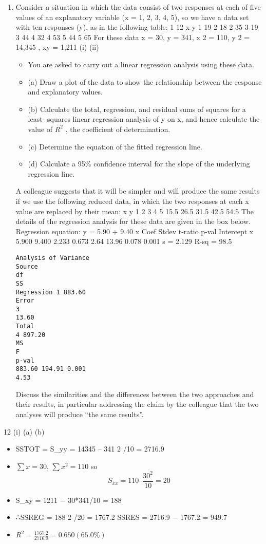 \documentclass[a4paper,12pt]{article}
\begin{document}
\begin{enumerate}

\item Consider a situation in which the data consist of two responses at each of five values of an explanatory variable (x = 1, 2, 3, 4, 5), so we have a data set with ten responses (y), as in the following table:
1
12
x
y
1
19
2
18
2
35
3
19
3
44
4
32
4
53
5
44
5
65
For these data \sum x = 30, \sum y = 341, \sum x 2 = 110, \sum y 2 = 14,345 , \sum xy = 1,211
(i)
(ii)
\begin{itemize}
\item You are asked to carry out a linear regression analysis using these data.
\item (a) Draw a plot of the data to show the relationship between the response and explanatory values.
\item (b) Calculate the total, regression, and residual sums of squares for a least- squares linear regression analysis of y on x, and hence calculate the value of $R^2$ , the coefficient of determination.
\item (c) Determine the equation of the fitted regression line.
\item (d) Calculate a 95\% confidence interval for the slope of the underlying regression line.
\end{itemize}
A colleague suggests that it will be simpler and will produce the same results if we use the following reduced data, in which the two responses at each x
value are replaced by their mean:
x
y
1
2
3
4
5
15.5 26.5 31.5 42.5 54.5
The details of the regression analysis for these data are given in the box below.
Regression equation: y = 5.90 + 9.40 x
Coef Stdev t-ratio p-val
Intercept
x 5.900
9.400 2.233
0.673 2.64
13.96 0.078
0.001
s = 2.129 R-sq = 98.5%
\begin{verbatim}
Analysis of Variance
Source
df
SS
Regression 1 883.60
Error
3
13.60
Total
4 897.20
MS
F
p-val
883.60 194.91 0.001
4.53
\end{verbatim}
Discuss the similarities and the differences between the two approaches and their
results, in particular addressing the claim by the colleague that the two analyses will
produce “the same results”.

\end{enumerate}
\newpage
12
(i)
(a)
(b)
\begin{itemize}
\item SSTOT = S_{yy} = 14345 – 341 2 /10 = 2716.9
\item $\sum x = 30$, $\sum x^2 = 110$ so \[S_{xx} = 110 – \frac{30^2}{10} = 20\]
\item S_{xy} = 1211 − 30*341/10 = 188
\item ∴SSREG = 188 2 /20 = 1767.2
SSRES = 2716.9 − 1767.2 = 949.7
\item $R^2 = \frac{1767.2}{2716.9} = 0.650 (65.0\%)$
\end{itemize}
\end{document}
